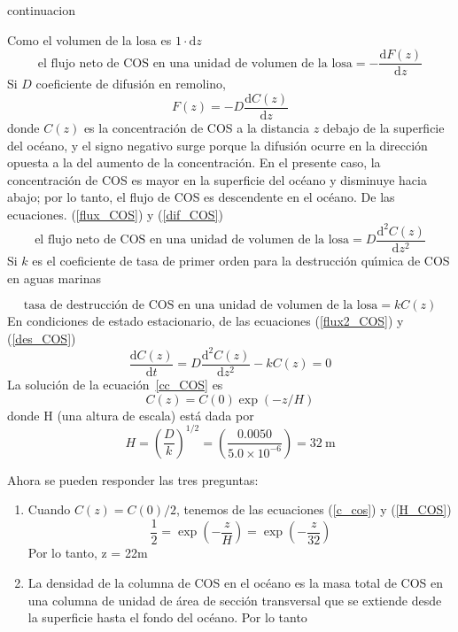 \begin{ejemplo} {continuacion}

Como el volumen de la losa es $1\cdot \mathrm{d}z$ 
\begin{equation}
\textrm{el flujo neto de COS en una unidad de volumen de la losa} =-\frac{\mathrm{d}F(z)}{\mathrm{d}z}
\label{flux_COS}
\end{equation}
Si $D$ coeficiente de difusi\'on en remolino,
\begin{equation}
F(z)=-D\frac{\mathrm{d}C(z)}{\mathrm{d}z}
\label{dif_COS}
\end{equation}
donde $C(z)$ es la concentraci\'on de COS a la distancia $z$ debajo de la superficie del oc\'eano, y el signo negativo surge porque la difusi\'on ocurre en la direcci\'on opuesta a la del aumento de la concentraci\'on. En el presente caso, la concentraci\'on de COS es mayor en la superficie del oc\'eano y disminuye hacia abajo; por lo tanto, el flujo de COS es descendente en el oc\'eano. De las ecuaciones. (\ref{flux_COS}) y (\ref{dif_COS})
\begin{equation}
\textrm{el flujo neto de COS en una unidad de volumen de la losa} =D\frac{\mathrm{d}^2C(z)}{\mathrm{d}z^2}
\label{flux2_COS}
\end{equation}
\noindent Si $k$ es el coeficiente de tasa de primer orden para la destrucci\'on qu\'{\i}mica de COS en aguas marinas 

\begin{equation}
\textrm{tasa de destrucci\'on de COS en una unidad de volumen de la losa} =kC(z)
\label{des_COS}
\end{equation}
\noindent En condiciones de estado estacionario, de las ecuaciones (\ref{flux2_COS}) y  (\ref{des_COS})
\begin{equation}
\frac{\mathrm{d}C(z)}{\mathrm{d}t}=D\frac{\mathrm{d}^2C(z)}{\mathrm{d}z^2}-kC(z)=0
\label{cc_COS}
\end{equation}
La soluci\'on de la ecuaci\'on~\ref{cc_COS} es
\begin{equation}
C(z)=C(0)\exp(-z/H)
\label{c_cos}
\end{equation}
\noindent donde H (una altura de escala) est\'a dada por
\begin{equation}
H=\left( \frac{D}{k}\right)^{1/2} =  \left( \frac{0.0050}{5.0\times10^{-6}}\right)=\SI{32}{\metre}
\label{H_COS}
\end{equation}

Ahora se pueden responder las tres preguntas:

\begin{enumerate}
\item Cuando $C(z)=C(0)/2$, tenemos de las ecuaciones (\ref{c_cos}) y  (\ref{H_COS}) 
\begin{equation*}
\frac{1}{2}=\exp\left(-\frac{z}{H} \right)=\exp\left( -\frac{z}{32}\right)
\end{equation*}
Por lo tanto, z = 22m
\item La densidad de la columna de COS en el oc\'eano es la masa total de COS en una columna de unidad de \'area de secci\'on transversal que se extiende desde la superficie hasta el fondo del oc\'eano. Por lo tanto


\end{enumerate}
\end{ejemplo}
